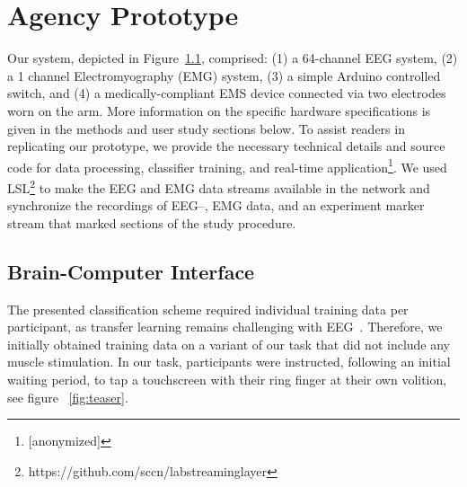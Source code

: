 \section{Agency Prototype}

Our system, depicted in Figure~\ref{}, comprised: (1) a 64-channel EEG system, (2) a 1 channel Electromyography (EMG) system, (3) a simple Arduino controlled switch, and (4) a medically-compliant EMS device connected via two electrodes worn on the arm. More information on the specific hardware specifications is given in the methods and user study sections below. To assist readers in replicating our prototype, we provide the necessary technical details and source code for data processing, classifier training, and real-time application\footnote{[anonymized]}. We used LSL\footnote{https://github.com/sccn/labstreaminglayer} to make the EEG and EMG data streams available in the network and synchronize the recordings of EEG--, EMG data, and an experiment marker stream that marked sections of the study procedure.


\subsection{Brain-Computer Interface}

The presented classification scheme required individual training data per participant, as transfer learning remains challenging with EEG~\cite{Wan2021-zz}. Therefore, we initially obtained training data on a variant of our task that did not include any muscle stimulation. In our task, participants were instructed, following an initial waiting period, to tap a touchscreen with their ring finger at their own volition, see figure ~\ref{fig:teaser}. 

